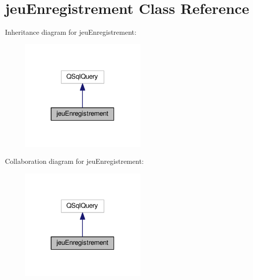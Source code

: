 \hypertarget{classjeu_enregistrement}{}\section{jeu\+Enregistrement Class Reference}
\label{classjeu_enregistrement}


Inheritance diagram for jeu\+Enregistrement\+:\nopagebreak
\begin{figure}[H]
\begin{center}
\leavevmode
\includegraphics[width=175pt]{classjeu_enregistrement__inherit__graph}
\end{center}
\end{figure}


Collaboration diagram for jeu\+Enregistrement\+:\nopagebreak
\begin{figure}[H]
\begin{center}
\leavevmode
\includegraphics[width=175pt]{classjeu_enregistrement__coll__graph}
\end{center}
\end{figure}
